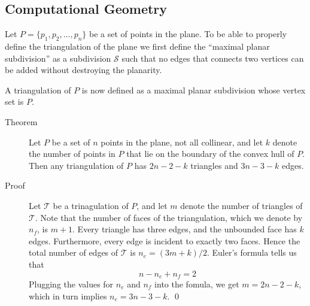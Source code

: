 \subsection{Computational Geometry}
Let $P = \{p_1, p_2, ..., p_n\}$ be a set of points in the plane. To be able to
properly define the triangulation of the plane we first define the ``maximal
planar subdivision'' as a subdivision $\mathcal{S}$ such that no edges that
connects two vertices can be added without destroying the planarity.

A triangulation of $P$ is now defined as a maximal planar subdivision whose
vertex set is $P$.

\begin{description}
\item[Theorem] Let $P$ be a set of $n$ points in the plane, not all collinear,
  and let $k$ denote the number of points in $P$ that lie on the boundary of the
  convex hull of $P$. Then any triangulation of $P$ has $2n−2−k$ triangles and
  $3n−3−k$ edges.

\item[Proof] Let $\mathcal{T}$ be a trinagulation of $P$, and let $m$ denote the
  number of triangles of $\mathcal{T}$.  Note that the number of faces of the
  triangulation, which we denote by $n_f$, is $m+1$. Every triangle has three
  edges, and the unbounded face has $k$ edges.  Furthermore, every edge is
  incident to exactly two faces. Hence the total number of edges of
  $\mathcal{T}$ is $n_e = (3m+k)/2$. Euler's formula tells us that
  \[
    n-n_e+n_f = 2
  \]
  Plugging the values for $n_e$ and $n_f$ into the fomula, we get $m=2n-2-k$,
  which in turn implies $n_e = 3n-3-k$. \qed
\end{description}

